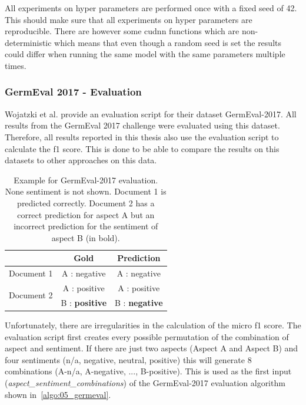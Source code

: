 All experiments on hyper parameters are performed once with a fixed seed of 42. This should make sure that all experiments on hyper parameters are reproducible. There are however some cudnn functions which are non-deterministic which means that even though a random seed is set the results could differ when running the same model with the same parameters multiple times.

\subsubsection*{GermEval 2017 - Evaluation}
\label{sec:05_GermEvalEvaluation}
Wojatzki et al. \cite{Wojatzki} provide an evaluation script for their dataset GermEval-2017. All results from the GermEval 2017 challenge were evaluated using this dataset. Therefore, all results reported in this thesis also use the evaluation script to calculate the f1 score. This is done to be able to compare the results on this datasets to other approaches on this data.

\begin{table}
	\centering
	\label{tab:05_germevalEvaluationExample}
	\caption{Example for GermEval-2017 evaluation. None sentiment is not shown. Document 1 is predicted correctly. Document 2 has a correct prediction for aspect A but an incorrect prediction for the sentiment of aspect B {(in bold)}.}
	\begin{tabular}{@{}lcc}
		\toprule 
		& \textbf{Gold} & \textbf{Prediction} \\ 
		\hline 
		Document 1 & A : negative & A : negative \\ 
		\hline 
		\multirow{2}{*}{Document 2} & A : positive & A : positive \\ 
		& B : \textbf{positive} & B : \textbf{negative} \\ 
		\hline 
	\end{tabular}
\end{table}

Unfortunately, there are irregularities in the calculation of the micro f1 score. The evaluation script first creates every possible permutation of the combination of aspect and sentiment. If there are just two aspects {(Aspect A and Aspect B)} and four sentiments {(n/a, negative, neutral, positive)} this will generate 8 combinations {(A-n/a, A-negative, ..., B-positive)}. This is used as the first input {(\textit{aspect\_sentiment\_combinations})} of the GermEval-2017 evaluation algorithm shown in~\ref{algo:05_germeval}.
\medskip

